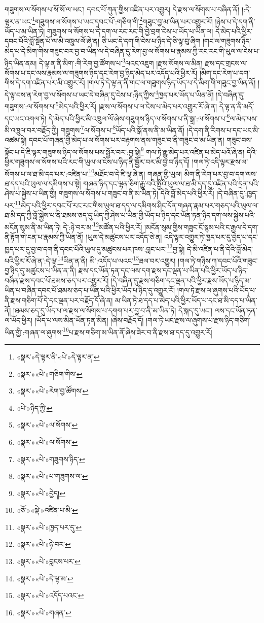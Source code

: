 གཟུགས་ལ་སོགས་པ་སོ་སོ་ལ་ཡང་། དབང་པོ་ཀུན་གྱིས་འཛིན་པར་འགྱུར། དེ་རྫས་ལ་སོགས་པ་བཞིན་ནོ། །:དེ་ལྟར་ན་ཡང་\footnote{«སྣར་»དེ་ལྟར་ནི་«པེ་»དེ་ལྟར་ན་}གཟུགས་ལ་སོགས་པ་ཡང་དབང་པོ་:གཅིག་གི་\footnote{«སྣར་»«པེ་»གཅིག་གིས་}གཟུང་བྱ་མ་ཡིན་པར་འགྱུར་རོ། །ཉེས་པ་དེ་དག་ནི་ཡོད་པ་མ་ཡིན་ཏེ། གཟུགས་ལ་སོགས་པ་དེ་དག་ལ་རང་རང་གི་བྱེ་བྲག་ངེས་པ་ཡོད་པ་ཡིན་ལ། དེ་མེད་པའི་ཕྱིར་དབང་པོའི་བློ་སྔོན་པོ་ལ་མི་འཁྲུལ་ལོ་ཞེ་ན། ཅི་ཡང་དེ་དག་གི་ངེས་པ་ཉིད་དེ་ཅི་ལྟ་བུ་ཞིག །གང་ལ་གཟུགས་ཉིད་མེད་པ་དེ་མིག་གིས་གཟུང་བར་བྱ་བ་ཡིན་ལ་དེ་བཞིན་དུ་རེག་བྱ་ལ་སོགས་པ་རྣམས་ཀྱི་རང་རང་གི་ཡུལ་ལ་ངེས་པ་ཉིད་ཡིན་ནམ། དེ་ལྟ་ན་ནི་མིག་:གི་རེག་བྱ་ཚོགས་པ་\footnote{«སྣར་»«པེ་»རེག་བྱ་ཚོགས་}ལའང་འཇུག །རྫས་སོགས་ལ་མིན། རྫས་དང་གྲངས་ལ་སོགས་པ་དང་ལས་རྣམས་ལ་གཟུགས་ཉིད་དང་རེག་བྱ་ཉིད་མེད་པར་འདོད་པའི་ཕྱིར་རོ། །མིག་དང་རེག་པ་དག་གིས་དེ་དག་འཛིན་པར་མི་འགྱུར་རོ། །གལ་ཏེ་དེ་ལྟ་ན་ནི་གང་ལ་གཟུགས་ཉིད་ཡོད་པ་དེ་མིག་གི་གཟུང་བྱ་ཡིན་ནོ། །དེ་ལྟ་བས་ན་རེག་བྱ་ལ་སོགས་པ་ཡང་དེ་བཞིན་དུ་ངེས་པ་:ཉིད་ཀྱིས་\footnote{«པེ་»ཉིད་ཀྱི་}ཁྱད་པར་ཡོད་པ་ཡིན་ནོ། །དེ་བཞིན་དུ་གཟུགས་:ལ་སོགས་པ་\footnote{«སྣར་»«པེ་»ལ་སོགས་}མེད་པའི་ཕྱིར་རོ། །རྫས་ལ་སོགས་པ་ལ་ངེས་པ་མེད་པར་འགྱུར་རོ་ཞེ་ན། དེ་ལྟ་ན་ནི་མདོ་དང་ཡང་འགལ་ཏེ། དེ་མེད་པའི་ཕྱིར་མི་འཁྲུལ་ལོ་ཞེས་གཟུགས་ཉིད་ལ་སོགས་པ་ནི་སྒྲ་:ལ་སོགས་པ་\footnote{«སྣར་»«པེ་»ལ་སོགས་}ལ་མེད་པས་མི་འཁྲུལ་བར་བརྗོད་ཀྱི། གཟུགས་\footnote{«སྣར་»«པེ་»གཟུགས་ཉིད་}ལ་སོགས་པ་\footnote{«སྣར་»«པེ་»པ་གཟུགས་ལ་}ཡོད་པའི་སྒོ་ནས་ནི་མ་ཡིན་ནོ། །དེ་དག་ནི་རིགས་པ་དང་ཡང་མི་འཚམ་སྟེ། དབང་པོ་གཞན་གྱི་མེད་པ་ལ་སོགས་པར་བརྟགས་ནས་གཟུང་བ་ནི་གཟུང་བ་མ་ཡིན་ན། གཟུང་བས་སྟོང་པ་དེ་ཇི་ལྟར་གཟུགས་ཉིད་ལ་སོགས་པས་སྦྱོར་བར་:བྱ་སྟེ།\footnote{«སྣར་»«པེ་»བྱེད།} གལ་ཏེ་རྒྱུ་མེད་པར་འཛིན་པ་མེད་པའོ་ཞེ་ན། དེའི་ཕྱིར་གཟུགས་ལ་སོགས་པའི་རང་གི་ཡུལ་ལ་ངེས་པ་ཉིད་ནི་སྦྱོར་བར་མི་བྱ་བ་ཉིད་དོ། །གལ་ཏེ་འདི་ལྟར་རྫས་ལ་སོགས་པ་ལ་ཐ་མི་དད་པར་:འཛིན་པ་\footnote{«ཅོ་»«སྡེ་»འཛིན་པ་མི་}མཐོང་བ་དེ་ཇི་ལྟ་ཞེ་ན། གཞན་གྱི་ཡུལ། མིག་ནི་རེག་པར་བྱ་བ་དག་ལས་ཐ་དད་པའི་ཡུལ་ལ་དམིགས་པ་སྟེ། གཞན་ཉིད་དང་ལྷན་ཅིག་རྒྱུ་བའི་སྤྱིའི་ཡུལ་ལ་ཐ་མི་དད་དུ་འཛིན་པའི་དྲན་པའི་ཤེས་པ་སྐྱེས་པ་ཡིན་གྱི། གཟུགས་ལ་སོགས་པ་གཟུང་བ་ནི་མ་ཡིན་ཏེ། དེའི་བློ་མེད་པའི་ཕྱིར་རོ། །དེ་བཞིན་དུ་:ཁྱད་པར་\footnote{«སྣར་»«པེ་»ཁྱད་པར་དུ་}མེད་པའི་ཕྱིར་དབང་པོ་རང་རང་གིས་ཡུལ་ཐ་དད་ལ་དམིགས་ཤིང་དོན་གཞན་རྣམ་པར་གཅད་པའི་ཡུལ་ལ་ཐ་མི་དད་ཀྱི་བློ་སྐྱེས་པ་ནི་ཐམས་ཅད་དུ་ཡིད་ཀྱི་ཤེས་པ་ཡིན་གྱི་ཡོད་པ་ཉིད་དང་ཡོན་ཏན་ཉིད་དག་ལས་སྐྱེས་པའི་མངོན་སུམ་ནི་མ་ཡིན་ཏེ། དེ་:ཉེ་བར་མ་\footnote{«སྣར་»«པེ་»ཉེ་བར་}མཚོན་པའི་ཕྱིར་རོ། །མངོན་སུམ་གྱིས་གཟུང་ངོ་སྙམ་པའི་ང་རྒྱལ་དེ་དག་ནི་རྟོག་གེ་ངན་པ་རྣམས་ཀྱི་ཡིན་ནོ། །ཡུལ་དེ་མཚུངས་པར་འདོད་ཅེ་ན། འདི་ལྟར་འགྱུར་ཏེ་ཁྱད་པར་དུ་བྱེད་པ་དང་ཁྱད་པར་དུ་བྱ་བ་དག་ནི་དབང་པོའི་ཡུལ་དུ་མཚུངས་པར་ཁས་:བླང་པར་\footnote{«སྣར་»«པེ་»བླངས་པར་}བྱ་སྟེ། དེ་མི་འཛིན་པ་ནི་དེའི་བློ་མེད་པའི་ཕྱིར་རོ་ཞེ་ན་:དེ་ལྟ་\footnote{«སྣར་»«པེ་»དེ་ལྟ་མ་}ཡིན་ན་ནི། མི་:འདོད་པ་ལའང་\footnote{«སྣར་»«པེ་»འདོད་པའང་}ཐལ་བར་འགྱུར། །གལ་ཏེ་གཉིས་ཀ་དབང་པོའི་གཟུང་བྱ་ཉིད་དུ་མཚུངས་པ་ཡིན་ན་ནི། རྫས་དང་ཡོན་ཏན་དང་ལས་དག་རྫས་དང་ལྡན་པ་ཡིན་པའི་ཕྱིར་ཡོད་པ་ཉིད་བཞིན་རྫས་དབང་པོ་ཐམས་ཅད་པར་འགྱུར་རོ། །དེ་བཞིན་དུ་རྫས་གཅིག་དང་ལྡན་པའི་ཕྱིར་རྫས་ཡོད་པ་ཉིད་མ་ཡིན་པ་བཞིན་དབང་པོ་ཐམས་ཅད་པ་ཡིན་པའི་ཕྱིར་ཡོད་པ་ཉིད་དུ་འགྱུར་རོ། །གལ་ཏེ་རྫས་ལ་ཞུགས་པའི་ཡོད་པ་ནི་རྫས་གཅིག་པོ་དེ་དང་ལྡན་པར་བརྗོད་དོ་ཞེ་ན། མ་ཡིན་ཏེ་ཐ་དད་པ་མེད་པའི་ཕྱིར་ཡོད་པ་དང་ཐ་མི་དད་པ་ཡིན་ནོ། །ཐམས་ཅད་དུ་ཡོད་པ་ལ་རྫས་ལ་སོགས་པ་དགག་པར་བྱ་བ་ནི་མ་ཡིན་ཏེ། དེ་སྐད་དུ་ཡང་། ལས་དང་ཡོན་ཏན་ལ་ཡོད་ཕྱིར། །ཡོད་པ་ལས་མིན་ཡོན་ཏན་མིན། །ཞེས་བརྗོད་དོ། །གལ་ཏེ་ཡང་རྫས་ལ་ཞུགས་པ་རྫས་ཉིད་གཅིག་ཡིན་གྱི་:གཞན་ལ་ཞུགས་\footnote{«སྣར་»«པེ་»གཞན་}པ་རྫས་གཅིག་མ་ཡིན་ནོ་ཞེས་ཟེར་བ་ནི་རྫས་ཐ་དད་དུ་འགྱུར་རོ། 